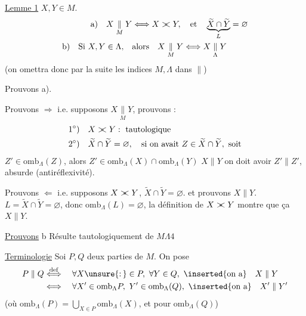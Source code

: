 \uline{Lemme 1}  $X,Y\in M$.
\[
\begin{aligned}
\text{a)}\quad X\underset{M}{\parallel}Y &\Longleftrightarrow X\mathrel{\rlap{$>$}<} Y,\quad\text{et}\quad \underbrace{\widetilde X\cap\widetilde Y}_{L}=\varnothing\\
\text{b)}\quad\text{Si } X,Y\in\Lambda,\quad&\text{alors}\quad X\underset{M}{\parallel}Y\Longleftrightarrow X\underset{\Lambda}{\parallel}Y
\end{aligned}
\]
(on omettra donc par la suite les indices $M,\Lambda$ dans $\parallel$)

Prouvons a). 

Prouvons $\Longrightarrow$ i.e. supposons $X\underset{M}{\parallel}Y$, prouvons :
\[
\begin{aligned}
1^{\circ})\quad &X\mathrel{\rlap{$>$}<} Y:\ \text{tautologique}\\
2^{\circ})\quad &\widetilde X\cap\widetilde Y=\varnothing,\quad\text{si on avait }Z\in\widetilde X\cap\widetilde Y,\ \text{soit}
\end{aligned}
\]
$Z'\in\mathrm{omb}_{\Lambda}(Z)$, alors $Z'\in\mathrm{omb}_{\Lambda}(X)\cap\mathrm{omb}_{\Lambda}(Y)$  $X\parallel Y$ on doit avoir $Z'\parallel Z'$, absurde (antiréflexivité).

Prouvons $\Longleftarrow$ i.e. supposons $X\mathrel{\rlap{$>$}<} Y$, $\widetilde X\cap\widetilde Y=\varnothing$. et prouvons $X\parallel Y$.     $L=\widetilde X\cap\widetilde Y=\varnothing$,  donc $\mathrm{omb}_{\Lambda}(L)=\varnothing$,  la définition de $X\mathrel{\rlap{$>$}<} Y$ montre que ça  $X\parallel Y$.

\uline{Prouvons} b Résulte tautologiquement de $M\Lambda4$

\uline{Terminologie} Soi $P,Q$ deux parties de $M$. On pose
\[
\begin{aligned}
P\parallel Q&\overset{\mathrm{def}}{\Longleftrightarrow}\quad\forall X\unsure{\mathpunct{:}}\in P,\ \forall Y\in Q,\ \text{\inserted{on a}}\quad X\parallel Y\\
&\Longleftrightarrow\quad\forall X'\in\mathrm{omb}_{\Lambda}P,\ Y'\in\mathrm{omb}_{\Lambda}(Q),\ \text{\inserted{on a}}\quad X'\parallel Y'
\end{aligned}
\]
(où $\mathrm{omb}_{\Lambda}(P)=\bigcup_{X\in P}\mathrm{omb}_{\Lambda}(X)$, et  pour $\mathrm{omb}_{\Lambda}(Q)$)
